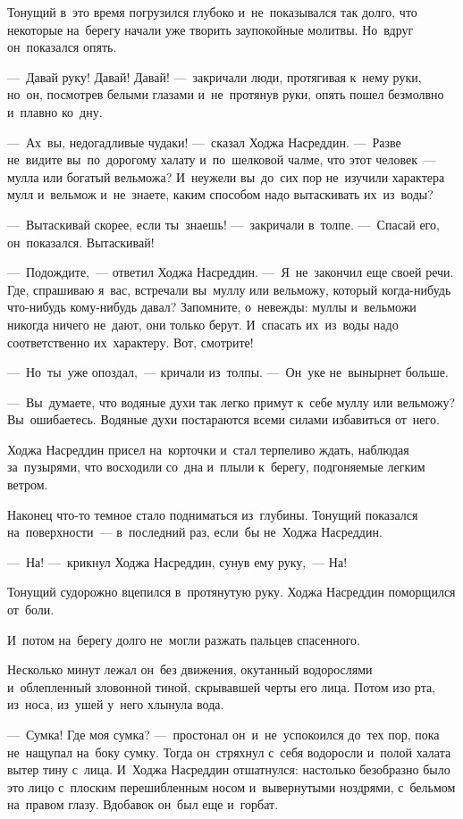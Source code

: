 \documentclass[12pt,a4paper]{book}
\begin{document}
Тонущий в~это время погрузился глубоко и~не~показывался так долго, что некоторые на~берегу начали уже творить заупокойные молитвы. Но~вдруг он~показался опять.

—~Давай руку! Давай! Давай! —~закричали люди, протягивая к~нему руки, но~он, посмотрев белыми глазами и~не~протянув руки, опять пошел безмолвно и~плавно ко~дну.

—~Ах~вы, недогадливые чудаки! —~сказал Ходжа Насреддин. —~Разве не~видите вы~по~дорогому халату и~по~шелковой чалме, что этот человек~— мулла или богатый вельможа? И~неужели вы~до~сих пор не~изучили характера мулл и~вельмож и~не~знаете, каким способом надо вытаскивать их~из~воды?

—~Вытаскивай скорее, если ты~знаешь! —~закричали в~толпе. —~Спасай его, он~показался. Вытаскивай!

—~Подождите,~— ответил Ходжа Насреддин. —~Я~не~закончил еще своей речи. Где, спрашиваю я~вас, встречали вы~муллу или вельможу, который когда-нибудь что-нибудь кому-нибудь давал? Запомните, о~невежды: муллы и~вельможи никогда ничего не~дают, они только берут. И~спасать их~из~воды надо соответственно их~характеру. Вот, смотрите!

—~Но~ты~уже опоздал,~— кричали из~толпы. —~Он~уке не~вынырнет больше.

—~Вы~думаете, что водяные духи так легко примут к~себе муллу или вельможу? Вы~ошибаетесь. Водяные духи постараются всеми силами избавиться от~него.

Ходжа Насреддин присел на~корточки и~стал терпеливо ждать, наблюдая за~пузырями, что восходили со~дна и~плыли к~берегу, подгоняемые легким ветром.

Наконец что-то темное стало подниматься из~глубины. Тонущий показался на~поверхности~— в~последний раз, если~бы не~Ходжа Насреддин.

—~На! —~крикнул Ходжа Насреддин, сунув ему руку,~— На!

Тонущий судорожно вцепился в~протянутую руку. Ходжа Насреддин поморщился от~боли.

И~потом на~берегу долго не~могли разжать пальцев спасенного.

Несколько минут лежал он~без движения, окутанный водорослями и~облепленный зловонной тиной, скрывавшей черты его лица. Потом изо рта, из~носа, из~ушей у~него хлынула вода.

—~Сумка! Где моя сумка? —~простонал он~и~не~успокоился до~тех пор, пока не~нащупал на~боку сумку. Тогда он~стряхнул с~себя водоросли и~полой халата вытер тину с~лица. И~Ходжа Насреддин отшатнулся: настолько безобразно было это лицо с~плоским перешибленным носом и~вывернутыми ноздрями, с~бельмом на~правом глазу. Вдобавок он~был еще и~горбат.
\end{document}
